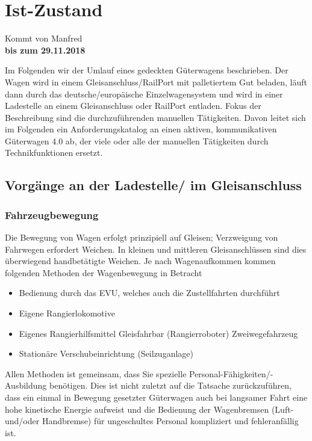 \section{Ist-Zustand}
Kommt von Manfred\\
\textbf{bis zum 29.11.2018}

Im Folgenden wir der Umlauf eines gedeckten Güterwagens beschrieben. Der Wagen wird in einem Gleisanschluss/RailPort mit palletiertem Gut beladen, läuft dann durch das deutsche/europäische Einzelwagensystem und wird in einer Ladestelle an einem Gleisanschluss oder RailPort entladen. Fokus der Beschreibung sind die durchzuführenden manuellen Tätigkeiten. Davon leitet sich im Folgenden ein Anforderungskatalog an einen aktiven, kommunikativen Güterwagen 4.0 ab, der viele oder alle der manuellen Tätigkeiten durch Technikfunktionen ersetzt.

\subsection{Vorgänge an der Ladestelle/ im Gleisanschluss}

\subsubsection{Fahrzeugbewegung}

Die Bewegung von Wagen erfolgt prinzipiell auf Gleisen; Verzweigung von Fahrwegen erfordert Weichen. In kleinen und mittleren Gleisanschlüssen sind dies überwiegend handbetätigte Weichen. Je nach Wagenaufkommen kommen folgenden Methoden der Wagenbewegung in Betracht
\begin{itemize}
	\item Bedienung durch das EVU, welches auch die Zustellfahrten durchführt
	\item Eigene Rangierlokomotive
	\item Eigenes Rangierhilfsmittel
		\subitem Gleisfahrbar (Rangierroboter)
		\subitem Zweiwegefahrzeug
	\item Stationäre Verschubeinrichtung (Seilzuganlage)
\end{itemize}
Allen Methoden ist gemeinsam, dass Sie spezielle Personal-Fähigkeiten/-Ausbildung benötigen. Dies ist nicht zuletzt auf die Tatsache zurückzuführen, dass ein einmal in Bewegung gesetzter Güterwagen auch bei langsamer Fahrt eine hohe kinetische Energie aufweist und die Bedienung der Wagenbremsen (Luft- und/oder Handbremse) für ungeschultes Personal kompliziert und fehleranfällig ist.


